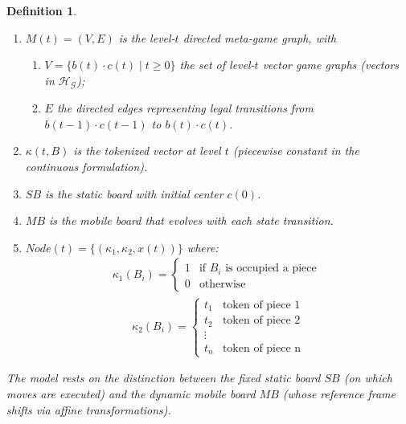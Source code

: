 \documentclass[11pt,a4paper]{article}
\theoremstyle{plain}
\newtheorem{definition}{Definition}[section]
\theoremstyle{definition}
\begin{document}
\begin{definition}
\begin{enumerate}
\item \(M(t) = (V, E)\) is the \emph{level-\(t\) directed meta-game graph}, with
  \begin{enumerate}
  \item \(V = \{ b(t) \cdot c(t) \mid t \geq 0 \}\) the set of \emph{level-\(t\) vector game graphs} (vectors in \(\mathcal{H}_\mathcal{G}\));
  \item \(E\) the directed edges representing legal transitions from \(b(t-1) \cdot c(t-1)\) to \(b(t) \cdot c(t)\).
  \end{enumerate}
\item \(\kappa(t, B)\) is the tokenized vector at level \(t\) (piecewise constant in the continuous formulation).
\item \(SB\) is the static board with initial center \(c(0)\).
\item \(MB\) is the mobile board that evolves with each state transition.
\item $Node(t) = \lbrace (\kappa_1, \kappa_2, x(t))\rbrace$ where:
\begin{equation}
\begin{aligned}
\kappa_1(B_i) = 
\begin{cases}
1 & \text{if } B_i \text{ is occupied a piece } \\
0 & \text{otherwise}
\end{cases}
\end{aligned}
\label{eq:Tokenized-Vector}
\end{equation}
\begin{equation}
\begin{aligned}
\kappa_2(B_i) = 
\begin{cases}
t_1 & \text{token of piece 1} \\
t_2 & \text{token of piece 2} \\
\vdots & \\
t_n & \text{token of piece n}
\end{cases}
\end{aligned}
\label{eq:Tokenized-Vector}
\end{equation}
\end{enumerate}

\vspace{0.5em}

The model rests on the distinction between the fixed static board \(SB\) (on which moves are executed) and the dynamic mobile board \(MB\) (whose reference frame shifts via affine transformations).
\end{definition}
\end{document}
